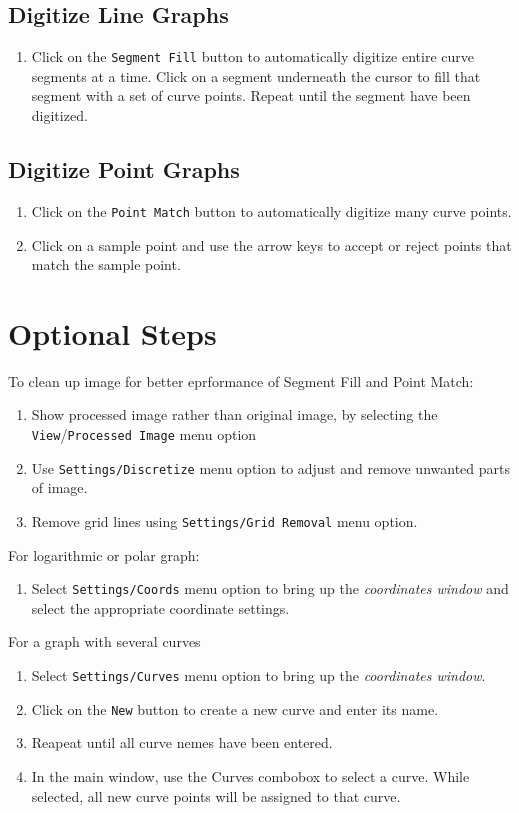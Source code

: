 \documentclass[norsk]{article} %
\numberwithin{equation}{section} %
\numberwithin{figure}{section} %
\numberwithin{table}{section} %
\begin{document}
\subsection{Digitize Line Graphs}
\begin{enumerate}
   \item Click on the \texttt{Segment Fill} button to automatically digitize entire curve
         segments at a time. Click on a segment underneath the cursor to fill that segment with a set
      of curve points. Repeat until the segment have been digitized.
\end{enumerate}

\subsection{Digitize Point Graphs}
\begin{enumerate}
   \item Click on the \texttt{Point Match} button to automatically digitize many curve points.
   \item Click on a sample point and use the arrow keys to accept or reject points that match
      the sample point.
      

\end{enumerate}

\section{Optional Steps}
To clean up image for better eprformance of Segment Fill and Point Match:
\begin{enumerate}
   \item Show processed image rather than original image, by selecting the 
      \texttt{View}/\texttt{Processed Image} menu option
   \item Use \texttt{Settings/Discretize} menu option to adjust 
      and remove unwanted parts of image.
   \item Remove grid lines using \texttt{Settings/Grid Removal} menu option.
\end{enumerate}
For logarithmic or polar graph:
\begin{enumerate}
   \item Select \texttt{Settings/Coords} menu option to bring up the \textit{coordinates window}
      and select the appropriate coordinate settings.
\end{enumerate}
For a graph with several curves
\begin{enumerate}
   \item Select \texttt{Settings/Curves} menu option to bring up the \textit{coordinates window}.
   \item Click on the \texttt{New} button to create a new curve and enter its name.
   \item Reapeat until all curve nemes have been entered.
   \item In the main window, use the Curves combobox to select a curve. While selected, all
      new curve points will be assigned to that curve.
\end{enumerate}
\end{document}
